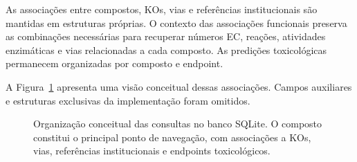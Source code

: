As associações entre compostos, KOs, vias e referências institucionais são
mantidas em estruturas próprias. O contexto das associações funcionais
preserva as combinações necessárias para recuperar números EC, reações,
atividades enzimáticas e vias relacionadas a cada composto. As predições
toxicológicas permanecem organizadas por composto e endpoint.

A Figura~\ref{fig:c2-relational-model} apresenta uma visão conceitual dessas
associações. Campos auxiliares e estruturas exclusivas da implementação foram
omitidos.

\begin{figure}[htbp]
\centering
{}
\caption{Organização conceitual das consultas no banco SQLite. O composto
constitui o principal ponto de navegação, com associações a KOs, vias,
referências institucionais e endpoints toxicológicos. }
\label{fig:c2-relational-model}
\end{figure}

